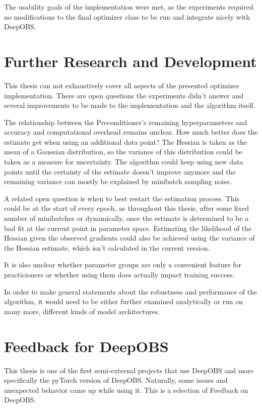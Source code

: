 \documentclass[twoside,12pt,a4paper]{report}
\begin{document}
The usability goals of the implementation were met, as the experiments required no modifications to the final optimizer class to be run and integrate nicely with DeepOBS.

\section{Further Research and Development}
This thesis can not exhaustively cover all aspects of the presented optimizer implementation. There are open questions the experiments didn't answer and several improvements to be made to the implementation and the algorithm itself.

The relationship between the Preconditioner's remaining hyperparameters and accuracy and computational overhead remains unclear. How much better does the estimate get when using an additional data point? The Hessian is taken as the mean of a Gaussian distribution, so the variance of this distribution could be taken as a measure for uncertainty. The algorithm could keep using new data points until the certainty of the estimate doesn't improve anymore and the remaining variance can mostly be explained by minibatch sampling noise.

A related open question is when to best restart the estimation process. This could be at the start of every epoch, as throughout this thesis, after some fixed number of minibatches or dynamically, once the estimate is determined to be a bad fit at the current point in parameter space. Estimating the likelihood of the Hessian given the observed gradients could also be achieved using the variance of the Hessian estimate, which isn't calculated in the current version.

It is also unclear whether parameter groups are only a convenient feature for practicioners or whether using them does actually impact training success.

In order to make general statements about the robustness and performance of the algorithm, it would need to be either further examined analytically or run on many more, different kinds of model architectures.

\section{Feedback for DeepOBS}
This thesis is one of the first semi-external projects that use DeepOBS and more specifically the pyTorch version of DeepOBS. Naturally, some issues and unexpected behavior came up while using it. This is a selection of Feedback on DeepOBS.
\end{document}
